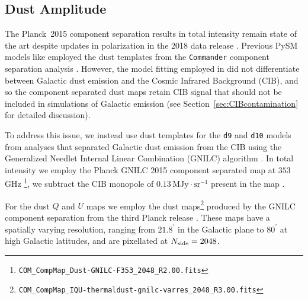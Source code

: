 \subsection{Dust Amplitude}
The Planck~2015 component separation results in total intensity remain state of the art despite updates in polarization in the 2018 data release \citep{planck2016-l04}. Previous PySM models like  employed the dust templates from the \texttt{Commander} component separation analysis \citep{planck2014-a11}. However, the model fitting employed in \citet{planck2014-a11} did not differentiate between Galactic dust emission and the Cosmic Infrared Background (CIB), and so the component separated dust maps retain CIB signal that should not be included in simulations of Galactic emission (see Section~\ref{sec:CIBcontamination} for detailed discussion).

To address this issue, we instead use dust templates for the {\tt d9} and {\tt d10} models from analyses that separated Galactic dust emission from the CIB using the Generalized Needlet Internal Linear Combination (GNILC) algorithm \citep{2011MNRAS.418..467R}. In total intensity we employ the Planck GNILC 2015 component separated map at $353$\,GHz \citep{planck2016-XLVIII}\footnote{\texttt{COM\_CompMap\_Dust-GNILC-F353\_2048\_R2.00.fits}}, 
 we subtract the CIB monopole of $0.13\, \text{MJy}\cdot\text{sr}^{-1}$ present in the map \citep[][Section~2.2]{planck2016-l04}.

For the dust $Q$ and $U$ maps we employ the dust maps\footnote{\texttt{COM\_CompMap\_IQU-thermaldust-gnilc-varres\_2048\_R3.00.fits}} produced by the GNILC component separation from the third Planck release \citep{planck2016-l04,planck2016-l11B}. These maps have a spatially varying resolution, ranging from $21.8^\prime$ in the Galactic plane to $80^\prime$ at high Galactic latitudes, and are pixellated at $N_{\rm side} = 2048$. 

